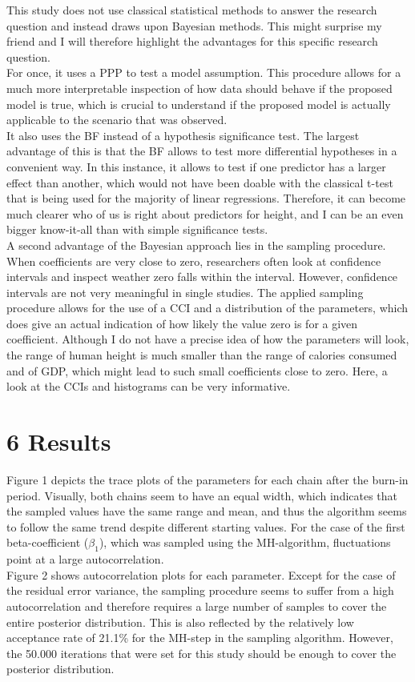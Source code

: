 \documentclass[
]{article}
\begin{document}
This study does not use classical statistical methods to answer the
research question and instead draws upon Bayesian methods. This might
surprise my friend and I will therefore highlight the advantages for
this specific research question.\\
For once, it uses a PPP to test a model assumption. This procedure
allows for a much more interpretable inspection of how data should
behave if the proposed model is true, which is crucial to understand if
the proposed model is actually applicable to the scenario that was
observed.\\
It also uses the BF instead of a hypothesis significance test. The
largest advantage of this is that the BF allows to test more
differential hypotheses in a convenient way. In this instance, it allows
to test if one predictor has a larger effect than another, which would
not have been doable with the classical t-test that is being used for
the majority of linear regressions. Therefore, it can become much
clearer who of us is right about predictors for height, and I can be an
even bigger know-it-all than with simple significance tests.\\
A second advantage of the Bayesian approach lies in the sampling
procedure. When coefficients are very close to zero, researchers often
look at confidence intervals and inspect weather zero falls within the
interval. However, confidence intervals are not very meaningful in
single studies. The applied sampling procedure allows for the use of a
CCI and a distribution of the parameters, which does give an actual
indication of how likely the value zero is for a given coefficient.
Although I do not have a precise idea of how the parameters will look,
the range of human height is much smaller than the range of calories
consumed and of GDP, which might lead to such small coefficients close
to zero. Here, a look at the CCIs and histograms can be very
informative.

\hypertarget{results}{%
\section{6 Results}\label{results}}

Figure 1 depicts the trace plots of the parameters for each chain after
the burn-in period. Visually, both chains seem to have an equal width,
which indicates that the sampled values have the same range and mean,
and thus the algorithm seems to follow the same trend despite different
starting values. For the case of the first beta-coefficient
(\(\beta_1\)), which was sampled using the MH-algorithm, fluctuations
point at a large autocorrelation.\\
Figure 2 shows autocorrelation plots for each parameter. Except for the
case of the residual error variance, the sampling procedure seems to
suffer from a high autocorrelation and therefore requires a large number
of samples to cover the entire posterior distribution. This is also
reflected by the relatively low acceptance rate of 21.1\% for the
MH-step in the sampling algorithm. However, the 50.000 iterations that
were set for this study should be enough to cover the posterior
distribution.
\end{document}
